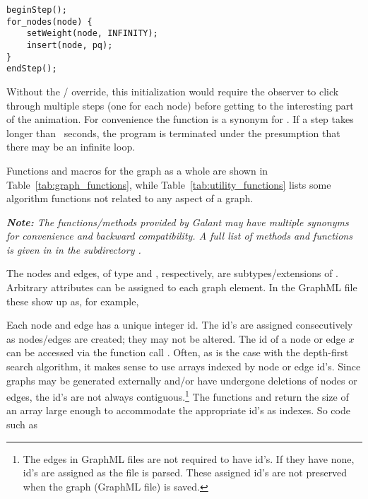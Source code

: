 \begin{center}
\begin{minipage}{0.5\textwidth}
\begin{verbatim}
beginStep();
for_nodes(node) {
    setWeight(node, INFINITY);
    insert(node, pq);
}
endStep();
\end{verbatim}
\end{minipage}
\end{center}

Without the /
override, this initialization would require the observer to click
through multiple steps (one for each node) before getting to the interesting
part of the animation.
For convenience the function  is a synonym for .
If a step takes longer than \Timeout\ seconds, the program is terminated
under the presumption that there may be an infinite loop.





Functions and macros for the graph as a whole are shown in Table~\ref{tab:graph_functions}, while Table~\ref{tab:utility_functions} lists some algorithm functions not related to any aspect of a graph.

\emph{\textbf{Note:} The functions/methods provided by Galant may have multiple synonyms for
convenience and backward compatibility. A full list of methods and functions
is given in  in the subdirectory
.}

The nodes and edges, of type  and , respectively,
are subtypes/extensions of .
Arbitrary attributes can be assigned to each graph element. In the GraphML file
these show up as, for example,\\
\hspace*{3em}

Each node and edge has a unique integer id.
The id's are assigned consecutively as nodes/edges are created;
they may not be altered.
The id of a node or edge $x$ can be accessed via the function call .
Often, as is the case with the depth-first search algorithm, it makes sense to use
arrays indexed by node or edge id's.
Since graphs may be generated externally and/or have undergone deletions of nodes or
edges, the id's are not always contiguous.\footnote{
  The edges in GraphML files are not required to have id's. If they have
  none, id's are assigned as the file is parsed. These assigned id's are not
  preserved when the graph (GraphML file) is saved.
}
The functions  and  return the size of an array
large enough to accommodate the appropriate id's as indexes. So code such as

